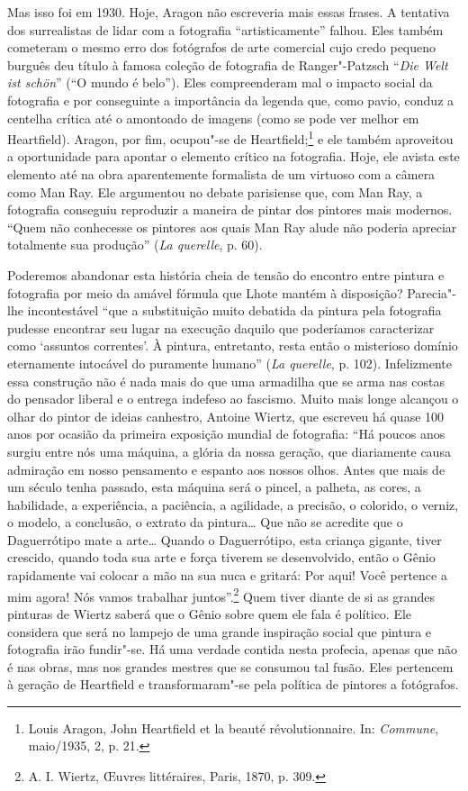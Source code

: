 Mas isso foi em 1930. Hoje, Aragon não escreveria mais essas frases. A
tentativa dos surrealistas de lidar com a fotografia ``artisticamente''
falhou. Eles também cometeram o mesmo erro dos fotógrafos de arte
comercial cujo credo pequeno burguês deu título à famosa
coleção de fotografia de Ranger"-Patzsch ``\emph{Die Welt ist schön}''
(``O mundo é belo''). Eles compreenderam mal o impacto social da
fotografia e por conseguinte a importância da legenda que, como pavio, conduz a
centelha crítica até o amontoado de imagens (como se pode ver melhor em
Heartfield). Aragon, por fim, ocupou"-se de Heartfield;\footnote{Louis
  Aragon, John Heartfield et la beauté révolutionnaire. In: \emph{Commune},
  maio/1935, 2, p. 21.} e ele também aproveitou a oportunidade
para apontar o elemento crítico na fotografia. Hoje, ele avista este
elemento até na obra aparentemente formalista de um virtuoso com a câmera
como Man Ray. Ele argumentou no debate parisiense que, com Man Ray, a
fotografia conseguiu reproduzir a maneira de pintar dos pintores mais
modernos. ``Quem não conhecesse os pintores aos quais Man Ray alude não
poderia apreciar totalmente sua produção'' (\emph{La querelle}, p. 60).

Poderemos abandonar esta história cheia de tensão do encontro entre
pintura e fotografia por meio da amável fórmula que Lhote mantém à
disposição? Parecia"-lhe incontestável ``que a substituição muito
debatida da pintura pela fotografia pudesse encontrar seu lugar na
execução daquilo que poderíamos caracterizar como `assuntos correntes'. À
pintura, entretanto, resta então o misterioso domínio eternamente
intocável do puramente humano'' (\emph{La querelle}, p. 102).
Infelizmente essa construção não é nada mais do que uma armadilha que
se arma nas costas do pensador liberal e o entrega indefeso ao fascismo.
Muito mais longe alcançou o olhar do pintor de ideias canhestro, Antoine
Wiertz, que escreveu há quase 100 anos por ocasião da primeira exposição
mundial de fotografia: ``Há poucos anos surgiu entre nós uma máquina, a
glória da nossa geração, que diariamente causa admiração em nosso
pensamento e espanto aos nossos olhos. Antes que mais de um século tenha
passado, esta máquina será o pincel, a palheta, as cores, a habilidade,
a experiência, a paciência, a agilidade, a precisão, o colorido, o
verniz, o modelo, a conclusão, o extrato da pintura\ldots{} Que não se
acredite que o Daguerrótipo mate a arte\ldots{} Quando o Daguerrótipo, esta
criança gigante, tiver crescido, quando toda sua arte e força tiverem se
desenvolvido, então o Gênio rapidamente vai colocar a mão na sua nuca e
gritará: Por aqui! Você pertence a mim agora! Nós vamos trabalhar
juntos''.\footnote{A. I. Wiertz, \OE uvres littéraires, Paris, 1870, p. 309.}
Quem tiver diante de si as grandes pinturas de Wiertz saberá que o Gênio
sobre quem ele fala é político. Ele considera que será no lampejo de uma
grande inspiração social que pintura e fotografia irão fundir"-se. Há uma
verdade contida nesta profecia, apenas que não é nas obras, mas nos
grandes mestres que se consumou tal fusão. Eles pertencem à geração de
Heartfield e transformaram"-se pela política de pintores a fotógrafos.


